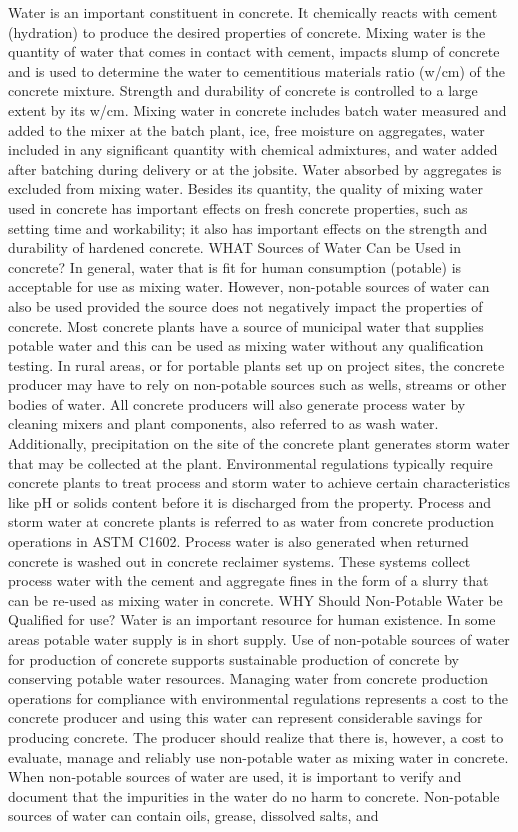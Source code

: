 Water is an important constituent in concrete. It chemically reacts with cement (hydration) to produce the desired properties of concrete. Mixing water is the quantity of water that comes in contact with cement, impacts slump of concrete and is used to determine the water to cementitious materials ratio (w/cm) of the concrete mixture. Strength and durability of concrete is controlled to a large extent by its w/cm. Mixing water in concrete includes batch water measured and added to the mixer at the batch plant, ice, free moisture on aggregates, water included in any significant quantity with chemical admixtures, and water added after batching during delivery or at the jobsite. Water absorbed by aggregates is excluded from mixing water.
Besides its quantity, the quality of mixing water used in concrete has important effects on fresh concrete properties, such as setting time and workability; it also has important effects on the strength and durability of hardened concrete.
WHAT Sources of Water Can be Used in concrete?
In general, water that is fit for human consumption (potable) is acceptable for use as mixing water. However, non-potable sources of water can also be used provided the source does not negatively impact the properties of concrete. Most concrete plants have a source of municipal water that supplies potable water and this can be used as mixing water without any qualification testing. In rural areas, or for portable plants set up on project sites, the concrete producer may have to rely on non-potable sources such as wells, streams or other bodies of water. All concrete producers will also generate process water by cleaning mixers and plant components, also referred to as wash water. Additionally, precipitation on the site of the concrete plant generates storm water that may be collected at the plant. Environmental regulations typically require concrete plants to treat process and storm water to achieve certain characteristics like pH or solids content before it is discharged from the property. Process and storm water at concrete plants is referred to as water from concrete production operations in ASTM C1602.
Process water is also generated when returned concrete is washed out in concrete reclaimer systems. These systems collect process water with the cement and aggregate fines in the form of a slurry that can be re-used as mixing water in concrete.
WHY Should Non-Potable Water be Qualified for use?
Water is an important resource for human existence. In some areas potable water supply is in short supply. Use of non-potable sources of water for production of concrete supports sustainable production of concrete by conserving potable water resources. Managing water from concrete production operations for compliance with environmental regulations represents a cost to the concrete producer and using this water can represent considerable savings for producing concrete. The producer should realize that there is, however, a cost to evaluate, manage and reliably use non-potable water as mixing water in concrete.
When non-potable sources of water are used, it is important to verify and document that the impurities in the water do no harm to concrete. Non-potable sources of water can contain oils, grease, dissolved salts, and


